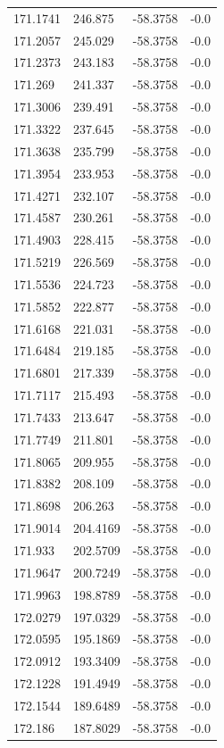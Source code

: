 \begin{table}[H]
\begin{tabular}{llll}
171.1741 & 246.875 & -58.3758 & -0.0 \\
171.2057 & 245.029 & -58.3758 & -0.0 \\
171.2373 & 243.183 & -58.3758 & -0.0 \\
171.269 & 241.337 & -58.3758 & -0.0 \\
171.3006 & 239.491 & -58.3758 & -0.0 \\
171.3322 & 237.645 & -58.3758 & -0.0 \\
171.3638 & 235.799 & -58.3758 & -0.0 \\
171.3954 & 233.953 & -58.3758 & -0.0 \\
171.4271 & 232.107 & -58.3758 & -0.0 \\
171.4587 & 230.261 & -58.3758 & -0.0 \\
171.4903 & 228.415 & -58.3758 & -0.0 \\
171.5219 & 226.569 & -58.3758 & -0.0 \\
171.5536 & 224.723 & -58.3758 & -0.0 \\
171.5852 & 222.877 & -58.3758 & -0.0 \\
171.6168 & 221.031 & -58.3758 & -0.0 \\
171.6484 & 219.185 & -58.3758 & -0.0 \\
171.6801 & 217.339 & -58.3758 & -0.0 \\
171.7117 & 215.493 & -58.3758 & -0.0 \\
171.7433 & 213.647 & -58.3758 & -0.0 \\
171.7749 & 211.801 & -58.3758 & -0.0 \\
171.8065 & 209.955 & -58.3758 & -0.0 \\
171.8382 & 208.109 & -58.3758 & -0.0 \\
171.8698 & 206.263 & -58.3758 & -0.0 \\
171.9014 & 204.4169 & -58.3758 & -0.0 \\
171.933 & 202.5709 & -58.3758 & -0.0 \\
171.9647 & 200.7249 & -58.3758 & -0.0 \\
171.9963 & 198.8789 & -58.3758 & -0.0 \\
172.0279 & 197.0329 & -58.3758 & -0.0 \\
172.0595 & 195.1869 & -58.3758 & -0.0 \\
172.0912 & 193.3409 & -58.3758 & -0.0 \\
172.1228 & 191.4949 & -58.3758 & -0.0 \\
172.1544 & 189.6489 & -58.3758 & -0.0 \\
172.186 & 187.8029 & -58.3758 & -0.0 \\

\end{tabular}
\end{table}
